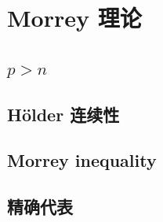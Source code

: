 \section{Morrey 理论}
\label{b1:sec:2403}


\subsection{\texorpdfstring{\(p>n\)}{p>n}}
\label{b1:subsec:240301}

\subsection{Hölder 连续性}
\label{b1:subsec:240302}

\subsection{Morrey inequality}
\label{b1:subsec:240303}

\subsection{精确代表}
\label{b1:subsec:240304}


